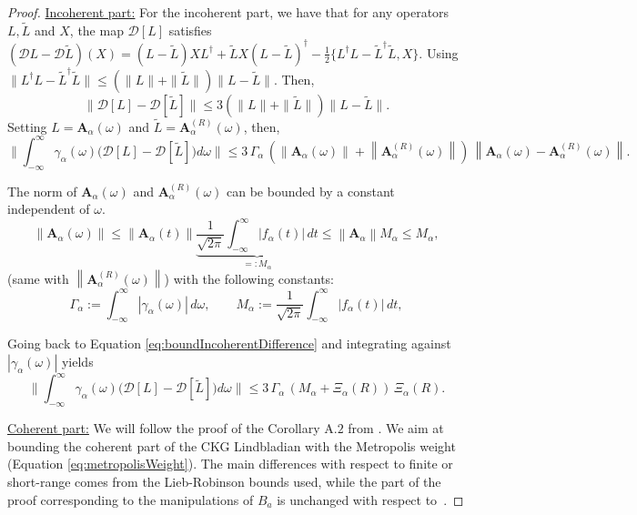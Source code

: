 \documentclass[11pt]{article}
\numberwithin{equation}{section}
\numberwithin{figure}{section}
\numberwithin{table}{section}
\theoremstyle{definition}
\theoremstyle{plain}
\theoremstyle{remark}
\newcommand{\w}{\omega}
\newcommand{\vA}{\bm{A}}
\newcommand{\norm}[1]{\left\lVert#1\right\rVert}
\begin{document}
\begin{proof}
\underline{Incoherent part:} For the incoherent part, we have that for any operators $L,\widetilde L$ and $X$, the map
$\mathcal D[L]$
satisfies $(\mathcal{D}L - \mathcal{D}\tilde{L})(X) = (L-\tilde{L})X L^\dagger + \tilde{L} X (L-\tilde{L})^\dagger - \frac{1}{2}\{L^\dagger L - \tilde{L}^\dagger \tilde{L}, X\}$. Using $\|L^\dagger L - \tilde{L}^\dagger \tilde{L}\| \leq (\|L\| + \|\tilde{L}\|)\|L - \tilde{L}\|$. Then,
\[
\|\mathcal D[L]-\mathcal D[\widetilde L]\|
\le
3(\|L\|+\|\widetilde L\|)\|L-\widetilde L\|.
\]
Setting $L=\vA_\alpha(\omega)$ and $\widetilde L=\vA^{(R)}_\alpha(\omega)$, then,
\begin{equation}
\Big\|\int_{-\infty}^{\infty}\!\gamma_\alpha(\omega)
\big(\mathcal D[L]-\mathcal D[\widetilde L]\big)d\omega\Big\|\leq 3\,\Gamma_\alpha\,\left (\norm{\vA_\alpha(\w)}+\norm{\vA^{(R)}_\alpha(\w)}\right )\,\norm{\vA_\alpha(\w)-\vA^{(R)}_\alpha(\w)}.
\label{eq:boundIncoherentDifference}
\end{equation}

The norm of $\vA_\alpha(\w)$ and $\vA^{(R)}_\alpha(\w)$ can be bounded by a constant independent of $\w$.
\begin{equation}
    \norm{\vA_\alpha(\w)}\leq \norm{\vA_\alpha(t)}\underbrace{\frac{1}{\sqrt{2\pi}}\int_{-\infty}^{\infty}\!|f_\alpha(t)|\,dt}_{=:M_\alpha}\leq \norm{\vA_\alpha}M_\alpha\leq M_\alpha,
\end{equation}
(same with $\norm{\vA_\alpha^{(R)}(\w)}$) with the following constants:
\begin{equation}
\Gamma_\alpha :=\int_{-\infty}^{\infty}\!|\gamma_\alpha(\omega)|\,d\omega,
\qquad
M_\alpha:=\frac{1}{\sqrt{2\pi}}\int_{-\infty}^{\infty}\!|f_\alpha(t)|\,dt,
\end{equation}

Going back to Equation \eqref{eq:boundIncoherentDifference} and integrating
against $|\gamma_\alpha(\omega)|$ yields
\begin{equation}
\Big\|\int_{-\infty}^{\infty}\!\gamma_\alpha(\omega)
\big(\mathcal D[L]-\mathcal D[\widetilde L]\big)d\omega\Big\| \le
3\,\Gamma_\alpha\,(M_\alpha+\Xi_\alpha(R))\,\Xi_\alpha(R).
\end{equation}

\medskip
\underline{Coherent part:} We will follow the proof of the Corollary A.$2$ from \cite{chen_quantum_2025}. We aim at bounding the coherent part of the CKG Lindbladian with the Metropolis weight (Equation \eqref{eq:metropolisWeight}). The main differences with respect to finite or short-range comes from the Lieb-Robinson bounds used, while  the part of the proof corresponding to the manipulations of $B_a$ is unchanged with respect to~\cite{chen_quantum_2025}.


\end{proof}
\end{document}
